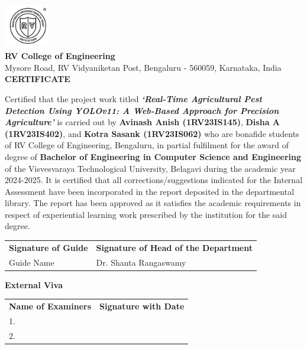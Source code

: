 \newpage
\thispagestyle{empty}

\begin{center}
    \includegraphics[width=0.15\textwidth]{image.png}\\[0.5cm] 
    \textbf{\large RV College of Engineering\textsuperscript{\textregistered}}\\
    Mysore Road, RV Vidyaniketan Post, Bengaluru - 560059, Karnataka, India\\[1cm]

    \textbf{\LARGE CERTIFICATE}\\[1cm]
\end{center}

\noindent
Certified that the project work titled \textbf{\textit{‘Real-Time Agricultural Pest Detection Using
YOLOv11: A Web-Based Approach for Precision
Agriculture’}} is carried out by \textbf{Avinash Anish (1RV23IS145)}, \textbf{Disha A (1RV23IS402)}, and \textbf{Kotra Sasank (1RV23IS062)} who are bonafide students of RV College of Engineering, Bengaluru, in partial fulfilment for the award of degree of \textbf{Bachelor of Engineering in Computer Science and Engineering} of the Visvesvaraya Technological University, Belagavi during the academic year 2024-2025. It is certified that all corrections/suggestions indicated for the Internal Assessment have been incorporated in the report deposited in the departmental library. The report has been approved as it satisfies the academic requirements in respect of experiential learning work prescribed by the institution for the said degree.

\vspace{2cm}

\noindent
\begin{tabular}{p{} p{}}
    \textbf{Signature of Guide} & \textbf{Signature of Head of the Department} \\
    Guide Name & Dr. Shanta Rangaswamy \\
\end{tabular}

\vspace{2cm}

\noindent
\textbf{External Viva}

\vspace{0.5cm}

\noindent
\begin{tabular}{p{} p{}}
    \textbf{Name of Examiners} & \textbf{Signature with Date} \\
    1. & \\
    2. & \\
\end{tabular}
